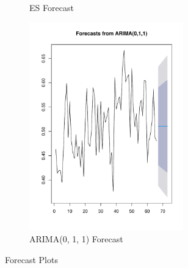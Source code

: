 \documentclass[12pt]{article}
\begin{document}
\begin{figure}[h]
\begin{subfigure}{0.32\textwidth}
\caption{ES Forecast}
\label{fig:subim2}
\end{subfigure}
\begin{subfigure}{0.32\textwidth}
\includegraphics[width=0.9\linewidth, height=9cm]{arima fore.pdf} 
\caption{ARIMA(0, 1, 1) Forecast}
\label{fig:subim3}
\end{subfigure}
\caption{Forecast Plots}
\label{fig:Figure 5}
\end{figure}\\
\newpage
\end{document}
